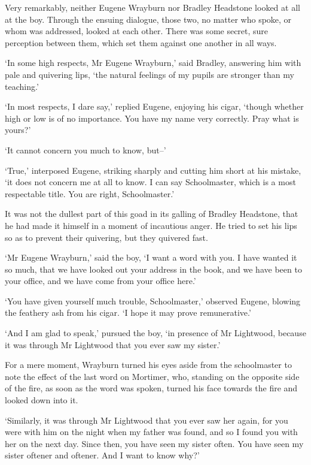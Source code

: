 Very remarkably, neither Eugene Wrayburn nor Bradley Headstone looked at
all at the boy. Through the ensuing dialogue, those two, no matter
who spoke, or whom was addressed, looked at each other. There was some
secret, sure perception between them, which set them against one another
in all ways.

‘In some high respects, Mr Eugene Wrayburn,’ said Bradley, answering
him with pale and quivering lips, ‘the natural feelings of my pupils are
stronger than my teaching.’

‘In most respects, I dare say,’ replied Eugene, enjoying his cigar,
‘though whether high or low is of no importance. You have my name very
correctly. Pray what is yours?’

‘It cannot concern you much to know, but--’

‘True,’ interposed Eugene, striking sharply and cutting him short at his
mistake, ‘it does not concern me at all to know. I can say Schoolmaster,
which is a most respectable title. You are right, Schoolmaster.’

It was not the dullest part of this goad in its galling of Bradley
Headstone, that he had made it himself in a moment of incautious anger.
He tried to set his lips so as to prevent their quivering, but they
quivered fast.

‘Mr Eugene Wrayburn,’ said the boy, ‘I want a word with you. I have
wanted it so much, that we have looked out your address in the book, and
we have been to your office, and we have come from your office here.’

‘You have given yourself much trouble, Schoolmaster,’ observed
Eugene, blowing the feathery ash from his cigar. ‘I hope it may prove
remunerative.’

‘And I am glad to speak,’ pursued the boy, ‘in presence of Mr Lightwood,
because it was through Mr Lightwood that you ever saw my sister.’

For a mere moment, Wrayburn turned his eyes aside from the schoolmaster
to note the effect of the last word on Mortimer, who, standing on the
opposite side of the fire, as soon as the word was spoken, turned his
face towards the fire and looked down into it.

‘Similarly, it was through Mr Lightwood that you ever saw her again, for
you were with him on the night when my father was found, and so I found
you with her on the next day. Since then, you have seen my sister often.
You have seen my sister oftener and oftener. And I want to know why?’

